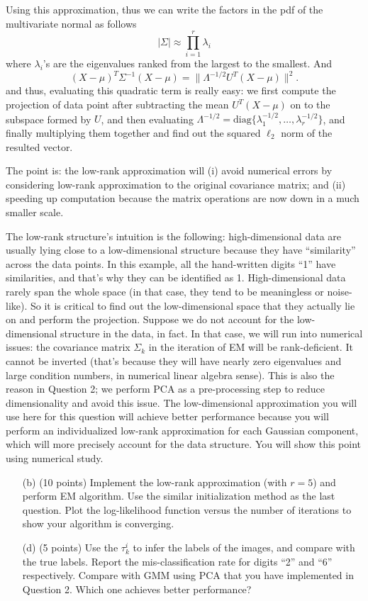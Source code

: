 \documentclass[twoside,12pt]{article}
\begin{document}
Using this approximation, thus we can write the factors in the pdf of the multivariate normal as follows
\[
|\Sigma| \approx \prod_{i=1}^r \lambda_i \]
where $\lambda_i$'s are the eigenvalues ranked from the largest to the smallest. And 
\[
(X-\mu)^T \Sigma^{-1}(X-\mu) = \|\Lambda^{-1/2}U^T (X-\mu) \|^2.
\]
and thus, evaluating this quadratic term is really easy: we first compute the projection of data point after subtracting the mean $U^T (X-\mu)$ on to the subspace formed by $U$, and then evaluating $\Lambda^{-1/2} = \mbox{diag}\{\lambda_1^{-1/2}, \ldots, \lambda_r^{-1/2}\}$, and finally multiplying them together and find out the squared $\ell_2$ norm of the resulted vector. 

The point is: the low-rank approximation will (i) avoid numerical errors by considering low-rank approximation to the original covariance matrix; and (ii) speeding up computation because the matrix operations are now down in a much smaller scale. 

The low-rank structure's intuition is the following: high-dimensional data are usually lying close to a low-dimensional structure because they have ``similarity'' across the data points. In this example, all the hand-written digits ``1'' have similarities, and that's why they can be identified as 1. High-dimensional data rarely span the whole space (in that case, they tend to be meaningless or noise-like). So it is critical to find out the low-dimensional space that they actually lie on and perform the projection. Suppose we do not account for the low-dimensional structure in the data, in fact. In that case, we will run into numerical issues: the covariance matrix $\Sigma_k$ in the iteration of EM will be rank-deficient. It cannot be inverted (that's because they will have nearly zero eigenvalues and large condition numbers, in numerical linear algebra sense). This is also the reason in Question 2; we perform PCA as a pre-processing step to reduce dimensionality and avoid this issue. The low-dimensional approximation you will use here for this question will achieve better performance because you will perform an individualized low-rank approximation for each Gaussian component, which will more precisely account for the data structure. You will show this point using numerical study. 

\begin{enumerate}


\item[(b)] (10 points) Implement the low-rank approximation (with $r = 5$) and perform EM algorithm. Use the similar initialization method as the last question. Plot the log-likelihood function versus the number of iterations to show your algorithm is converging.

\item[(d)] (5 points) Use the $\tau^i_k$ to infer the labels of the images, and compare with the true labels. Report the mis-classification rate for digits ``2'' and ``6'' respectively.  Compare with GMM using PCA that you have implemented in Question 2. Which one achieves better performance?

\end{enumerate}
\end{document}
